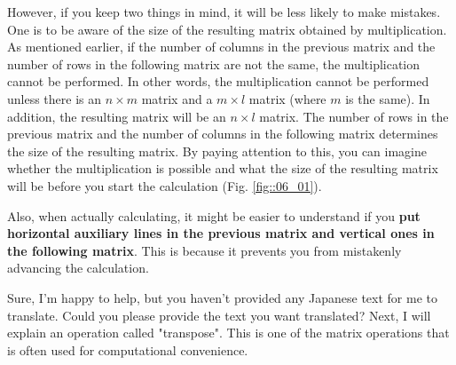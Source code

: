 \documentclass{ltjsbook}
\begin{document}
However, if you keep two things in mind, it will be less likely to make mistakes.
One is to be aware of the size of the resulting matrix obtained by multiplication. As mentioned earlier, if the number of columns in the previous matrix and the number of rows in the following matrix are not the same, the multiplication cannot be performed. In other words, the multiplication cannot be performed unless there is an $n \times m$ matrix and a $m \times l$ matrix (where $m$ is the same). In addition, the resulting matrix will be an $n \times l$ matrix. The number of rows in the previous matrix and the number of columns in the following matrix determines the size of the resulting matrix. By paying attention to this, you can imagine whether the multiplication is possible and what the size of the resulting matrix will be before you start the calculation (Fig. \ref{fig::06_01}).



Also, when actually calculating, it might be easier to understand if you \textbf{put horizontal auxiliary lines in the previous matrix and vertical ones in the following matrix}. This is because it prevents you from mistakenly advancing the calculation.




Sure, I'm happy to help, but you haven't provided any Japanese text for me to translate. Could you please provide the text you want translated?
Next, I will explain an operation called "transpose". This is one of the matrix operations that is often used for computational convenience.
\end{document}
